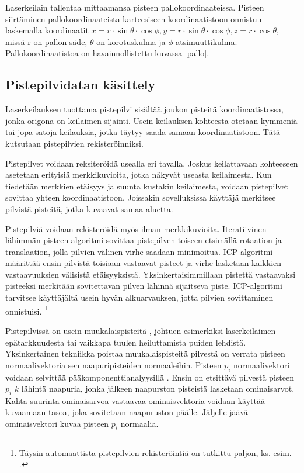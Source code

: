 Laserkeilain tallentaa mittaamansa pisteen pallokoordinaateissa. Pisteen siirtäminen pallokoordinaateista karteesiseen koordinaatistoon onnistuu laskemalla koordinaatit $x=r \cdot \sin \theta \cdot \cos \phi, y=r \cdot \sin \theta \cdot \cos \phi, z=r \cdot \cos \theta$, missä r on pallon säde, $\theta$ on korotuskulma ja $\phi$ atsimuuttikulma. Pallokoordinaatistoa on havainnollistettu kuvassa \ref{pallo}.

\subsection{Pistepilvidatan käsittely}\label{workflow}

Laserkeilauksen tuottama pistepilvi sisältää joukon pisteitä koordinaatistossa, jonka origona on keilaimen sijainti. Usein keilauksen kohteesta otetaan kymmeniä tai jopa satoja keilauksia, jotka täytyy saada samaan koordinaatistoon. Tätä kutsutaan pistepilvien rekisteröinniksi. 

Pistepilvet voidaan reksiteröidä usealla eri tavalla. Joskus keilattavaan kohteeseen asetetaan erityisiä merkkikuvioita, jotka näkyvät useasta keilaimesta. Kun tiedetään merkkien etäisyys ja suunta kustakin keilaimesta, voidaan pistepilvet sovittaa yhteen koordinaatistoon. Joissakin sovelluksissa käyttäjä merkitsee pilvistä pisteitä, jotka kuvaavat samaa aluetta.

Pistepilviä voidaan rekisteröidä myös ilman merkkikuvioita. Iteratiivinen lähimmän pisteen algoritmi  sovittaa pistepilven toiseen etsimällä rotaation ja translaation,
jolla pilvien välinen virhe saadaan minimoitua. ICP-algoritmi määrittää ensin pilvistä toisiaan vastaavat pisteet ja virhe lasketaan kaikkien vastaavuuksien välisistä etäisyyksistä.
Yksinkertaisimmillaan pistettä vastaavaksi pisteeksi merkitään sovitettavan pilven lähinnä sijaitseva piste. 
ICP-algoritmi tarvitsee käyttäjältä usein hyvän alkuarvauksen, jotta pilvien sovittaminen onnistuisi. 
\footnote{Täysin automaattista pistepilvien rekisteröintiä on tutkittu paljon, ks. esim. \cite{Pascal}.}

Pistepilvissä on usein muukalaispisteitä , johtuen esimerkiksi laserkeilaimen epätarkkuudesta tai vaikkapa tuulen heiluttamista puiden lehdistä. Yksinkertainen tekniikka poistaa muukalaispisteitä pilvestä on verrata pisteen normaalivektoria sen naapuripisteiden normaaleihin. Pisteen $p_i$ normaalivektori voidaan selvittää pääkomponenttianalyysillä . Ensin on etsittävä pilvestä pisteen $p_i$ $k$ lähintä naapuria, jonka jälkeen naapurston pisteistä lasketaan ominaisarvot. Kahta suurinta ominaisarvoa vastaavaa ominaisvektoria voidaan käyttää kuvaamaan tasoa, joka sovitetaan naapuruston päälle. Jäljelle jäävä ominaisvektori kuvaa pisteen $p_i$ normaalia. \cite{huang}

